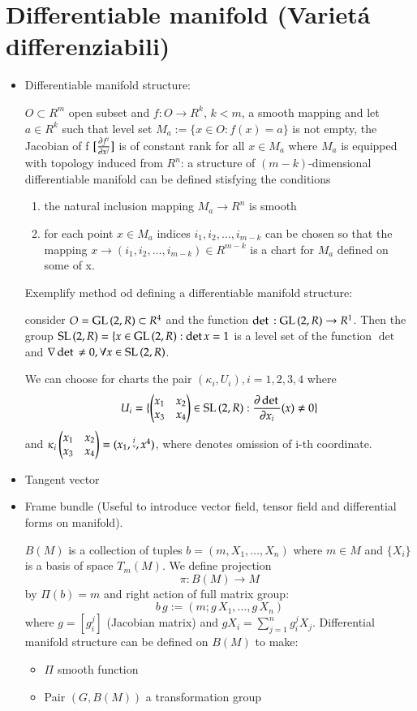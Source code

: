 \documentclass[oneside,12pt]{memoir}
\begin{document}
\section{Differentiable manifold (Variet\'a differenziabili)}

\begin{itemize}

\item Differentiable manifold structure:

$O\subset R^m$ open subset and $f:O\to R^k$, $k<m$, a smooth mapping and let $a\in R^k$ such that level set $M_a:=\{x\in O: f(x)=a\}$ is not empty, the Jacobian of f $[\PDy{x^j}{f^i}]$ is of constant rank for all $x\in M_a$ where $M_a$ is equipped with topology induced from $R^n$: a structure of $(m-k)$-dimensional differentiable manifold can be defined stisfying the conditions

\begin{enumerate}
\item the natural inclusion mapping $M_a\to R^n$ is smooth
\item for each point $x\in M_a$ indices $i_1,i_2,\ldots,i_{m-k}$ can be chosen so that the mapping $x\to(i_1,i_2,\ldots,i_{m-k})\in R^{m-k}$ is a chart for $M_a$ defined on some \nhd{} of x.
\end{enumerate}

Exemplify method od defining a differentiable manifold structure:

consider $O=\GL{(2,R)}\subset R^4$ and the function $\det{}:\GL{(2,R)}\to R^1$. Then the group $\SL{(2,R)}=\{x\in\GL{(2,R):\det{x}=1}$ is a level set of the function $\det{}$ and $\nabla\det{}\neq0, \forall x\in\SL{(2,R)}$.

We can choose for charts the pair $(\kappa_i,U_i), i=1,2,3,4$ where 
\begin{equation*}
U_i=\{\TwoperTwo{x_1}{x_2}{x_3}{x_4}\in\SL{(2,R): \PDy{x_i}{\det{}}(x)\neq0}\}
\end{equation*}
and $\kappa_i\TwoperTwo{x_1}{x_2}{x_3}{x_4}=(x_1,\missing{i},x^4)$, where denotes omission of i-th coordinate.
\item Tangent vector
\item Frame bundle (Useful to introduce vector field, tensor field and differential forms on manifold).

$B(M)$ is a collection of tuples $b=(m,X_1,\ldots,X_n)$ where $m\in M$ and $\{X_i\}$ is a basis of space $T_m(M)$. We define projection
\begin{equation*}
\pi:B(M)\to M
\end{equation*}
by $\Pi(b)=m$ and right action of full matrix group:
\begin{equation*}
b\,g:=(m;g\,X_1,\ldots,g\,X_n)
\end{equation*}
where $g=[g_i^j]$ (Jacobian matrix) and $gX_i=\sum_{j=1}^ng_i^jX_j$.
Differential manifold structure can be defined on $B(M)$ to make:
\begin{itemize}
\item $\Pi$ smooth function
\item Pair $(G, B(M))$ a transformation group
\end{itemize}


\end{itemize}
\end{document}
